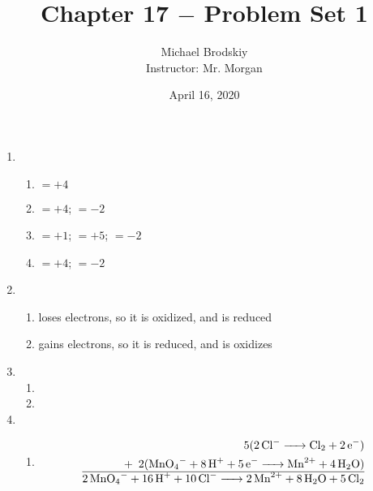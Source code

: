 \documentclass[12pt]{article}
\title{Chapter 17 $-$ Problem Set 1}
\date{April 16, 2020}
\author{Michael Brodskiy\\ \small Instructor: Mr. Morgan}
\begin{document}
\maketitle

\begin{enumerate}

  \item

    \begin{enumerate}

      \item {} $=+4$

      \item {} $=+4$;  $=-2$

      \item {} $=+1$;  $=+5$;  $=-2$

      \item {} $=+4$;  $=-2$

    \end{enumerate}

  \item

    \begin{enumerate}

      \item {} loses electrons, so it is oxidized, and  is reduced

      \item {} gains electrons, so it is reduced, and  is oxidizes

    \end{enumerate}

  \item

    \begin{enumerate}

      \item {}

      \item {}

    \end{enumerate}

  \item

    \begin{enumerate}

      \item 

        \begin{equation}
          \begin{split}
            5(\ce{2Cl- -> Cl2 + 2e-})\\
            +\,\,\,2(\ce{MnO4- + 8H+ + 5e- -> Mn^2+ + 4H2O})\\
            \hline
            \ce{2MnO4- + 16H+ + 10Cl- -> 2Mn^2+ + 8H2O + 5Cl2}
          \end{split}
          \label{1}
        \end{equation}


\end{enumerate}
\end{enumerate}
\end{document}
